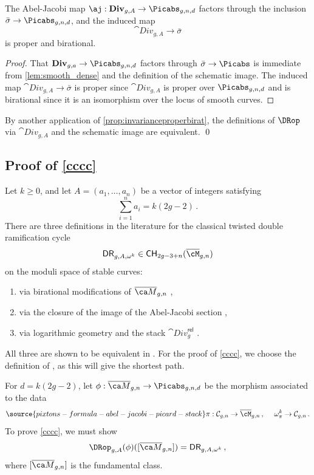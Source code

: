 \begin{lemma}
\notready \label{Lem:UschemdenseDiv}
The Abel-Jacobi map $\aj:\cat{Div}_{g,A} \to \Picabs_{g,n,d}$ factors through the
inclusion $\bar\sigma \to \Picabs_{g,n,d}$, and the induced map
$$\cat{Div}_{g,A} \to \bar \sigma$$
is proper and birational.
\end{lemma}
\begin{proof}
That $\cat{Div}_{g,a} \to \Picabs_{g,n,d}$ factors through $\bar\sigma \to \Picabs$ is immediate from \cref{lem:smooth_dense} and the definition of the schematic image. The induced map $\cat{Div}_{g,A} \to \bar \sigma$ is proper since $\cat{Div}_{g,A}$ is proper over $\Picabs_{g,n,d}$ and is birational since it is an isomorphism over the locus of smooth curves.
\end{proof}

By another application of \cref{prop:invarianceproperbirat}, the definitions of $\DRop$ via
$\cat{Div}_{g,A}$ and the
schematic image are equivalent. \qed

\subsection{Proof of \cref{cccc}}\label{proof1111}

Let $k\geq 0$, and let
 $A=(a_1,\ldots,a_n)$ be a vector of integers satisfying
$$\sum_{i=1}^n a_i=k(2g-2)\, .$$
There are three definitions in the literature for the classical twisted double ramification cycle
$$\mathsf{DR}_{g,A, \omega^k}\in \mathsf{CH}_{2g-3+n}(\overline{\cM}_{g,n}) $$
on the moduli space of stable curves:
\begin{enumerate}
\item[$\bullet$]via birational modifications of $\Mbar_{g,n}$ \cite{Holmes2017Extending-the-d},
\item[$\bullet$] via the closure of the image of the Abel-Jacobi section \cite{Holmes2017Jacobian-extens},
\item[$\bullet$]
via logarithmic geometry and the stack $\cat{Div}_g^{\mathsf{rel}}$ \cite{Marcus2017Logarithmic-com}.
\end{enumerate}
All three are shown to be equivalent
in \cite{Holmes2017Extending-the-d,Holmes2017Jacobian-extens}.
For the proof of \cref{cccc}, we choose the definition of \cite{Marcus2017Logarithmic-com}, as this will give the shortest path.

For $d=k(2g-2)$, let $\phi: \Mbar_{g,n} \to \Picabs_{g,n,d}$ be the morphism
associated to the data
\begin{equation}\label{fftt66673}
\source{pixtons-formula-abel-jacobi-picard-stack}
\pi: \mathcal{C}_{g,n} \rightarrow \overline{\cM}_{g,n}\, , \ \ \ \ \omega_\pi^k \rightarrow \mathcal{C}_{g,n}\, .
\end{equation}
To prove \cref{cccc}, we must show
$$\DRop_{g,A}(\phi)([\Mbar_{g,n}]) = \mathsf{DR}_{g,A, \omega^k}\, ,$$
where $[\Mbar_{g,n}]$ is the fundamental class.



